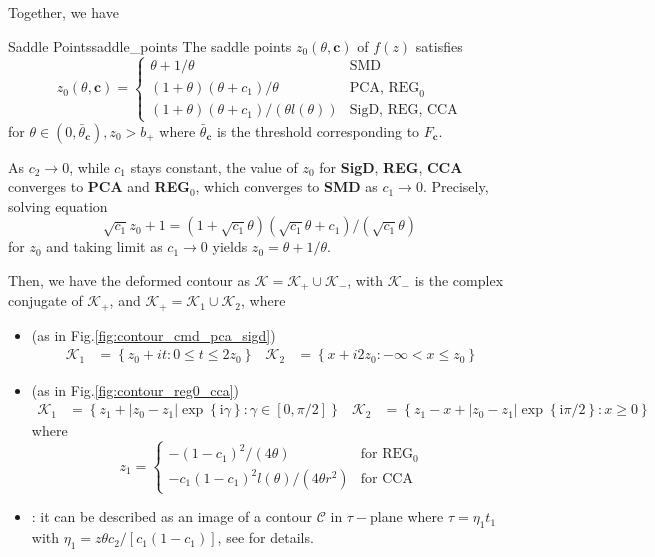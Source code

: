 \documentclass[twoside]{article}
\begin{document}
Together, we have 
\begin{lemma}{Saddle Points}{saddle_points}
    The saddle points $z_0(\theta,\mathbf{c})$ of $f(z)$ satisfies
    \begin{equation}
        z_0(\theta,\mathbf{c}) = \begin{cases}
            \theta + 1/\theta & \text{SMD}\\
            (1+\theta)(\theta+c_1)/\theta & \text{PCA, REG}_0\\
            (1+\theta)(\theta+c_1)/(\theta l(\theta)) & \text{SigD, REG, CCA}
        \end{cases}
    \end{equation}
    for $\theta \in (0,\bar{\theta}_{\mathbf{c}}),z_0>b_+$ where $\bar{\theta}_{\mathbf{c}}$ is the threshold corresponding to $F_{\mathbf{c}}$.
\end{lemma}

As $c_2\rightarrow 0$, while $c_1$ stays constant, the value of $z_0$ for \textbf{SigD}, \textbf{REG}, \textbf{CCA} converges to \textbf{PCA} and \textbf{REG}$_0$, which converges to \textbf{SMD} as $c_1\rightarrow 0$. Precisely, solving equation $$ \sqrt{c_1}z_0 +1 = (1+\sqrt{c_1}\theta)(\sqrt{c_1}\theta+c_1)/(\sqrt{c_1}\theta) $$
for $z_0$ and taking limit as $c_1\rightarrow 0$ yields $z_0 = \theta+1/\theta$.

Then, we have the deformed contour as $\mathcal{K}= \mathcal{K}_+\cup \mathcal{K}_-$, with $\mathcal{K}_-$ is the complex conjugate of $\mathcal{K}_+$, and $\mathcal{K}_+=\mathcal{K}_1\cup \mathcal{K}_2$, where
\begin{itemize}
    \item {} (as in Fig.\ref{fig:contour_cmd_pca_sigd})
    \begin{align*}
        \mathcal{K}_1 &= \left\{ z_0 + it: 0\leq t \leq 2z_0 \right\} & \mathcal{K}_2 &= \left\{ x+i2z_0: -\infty < x\leq z_0 \right\}
    \end{align*}
    \item {} (as in Fig.\ref{fig:contour_reg0_cca})
    \begin{align*}
        \mathcal{K}_1 &= \left\{ z_1 + \left\vert z_0-z_1 \right\vert \exp \left\{\mathrm{i}\gamma\right\}: \gamma\in[0,\pi/2] \right\} & \mathcal{K}_2 &= \left\{ z_1-x+\left\vert z_0-z_1 \right\vert \exp \left\{ \mathrm{i}\pi/2 \right\}: x \geq 0 \right\}
    \end{align*}
    where 
    $$
    z_1 = \begin{cases}
        -(1-c_1)^2/(4\theta) & \text{for REG}_0\\
        -c_1(1-c_1)^2l(\theta)/(4\theta r^2) & \text{for CCA}
    \end{cases}
    $$
    \item {}: it can be described as an image of a contour $\mathcal{C}$ in $\tau-$plane where $\tau = \eta_1 t_1$ with $\eta_1 = z\theta c_2/[c_1(1-c_1)]$, see \citet[P.20-21]{johnstone2020testing} for details.
\end{itemize}
\end{document}
